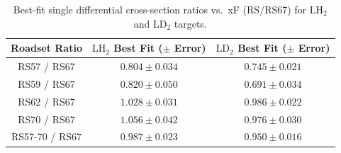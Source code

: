 \begin{table}[htbp]
\centering
\caption{Best-fit single differential cross-section ratios vs.\ xF ($\text{RS} / \text{RS67}$) for $\text{LH}_2$ and $\text{LD}_2$ targets.}
\label{tab:xsec_ratios_xf_vs_rs67}
\begin{tabular}{|c|c|c|}
\hline
\textbf{Roadset Ratio} & \textbf{$\text{LH}_2$ Best Fit ($\pm$ Error)} & \textbf{$\text{LD}_2$ Best Fit ($\pm$ Error)} \\
\hline
RS57 / RS67 & $0.804 \pm 0.034$ & $0.745 \pm 0.021$ \\
\hline
RS59 / RS67 & $0.820 \pm 0.050$ & $0.691 \pm 0.034$ \\
\hline
RS62 / RS67 & $1.028 \pm 0.031$ & $0.986 \pm 0.022$ \\
\hline
RS70 / RS67 & $1.056 \pm 0.042$ & $0.976 \pm 0.030$ \\
\hline
RS57-70 / RS67 & $0.987 \pm 0.023$ & $0.950 \pm 0.016$ \\
\hline
\end{tabular}
\end{table}
